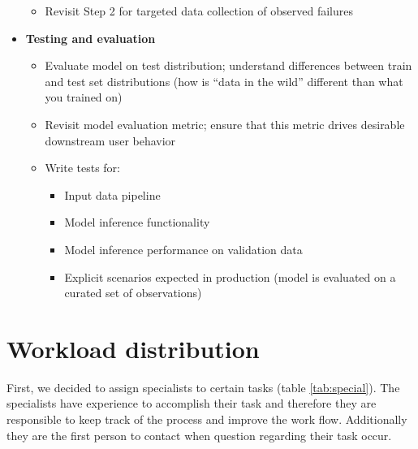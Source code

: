 \documentclass[lang=english,inputenc=utf8,fontsize=10pt]{ldvarticle}
\begin{document}
\begin{itemize}
\begin{itemize}
        \item Revisit Step 2 for targeted data collection of observed failures
    \end{itemize}
    \item \textbf{Testing and evaluation}
    \begin{itemize}
        \item Evaluate model on test distribution; understand differences between train and test set distributions (how is “data in the wild” different than what you trained on)
        \item Revisit model evaluation metric; ensure that this metric drives desirable downstream user behavior
        \item Write tests for:
        \begin{itemize}
            \item Input data pipeline
            \item Model inference functionality
            \item Model inference performance on validation data
            \item Explicit scenarios expected in production (model is evaluated on a curated set of observations)
        \end{itemize}
    \end{itemize}
\end{itemize}

\section{Workload distribution}
First, we decided to assign specialists to certain tasks (table \ref{tab:special}). The specialists have experience to accomplish their task and therefore they are responsible to keep track of the process and improve the work flow. Additionally they are the first person to contact when question regarding their task occur.\\
\end{document}
